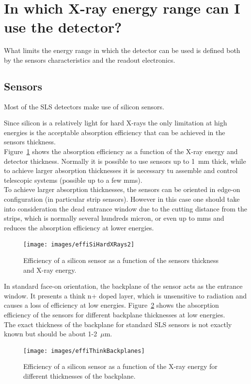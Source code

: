 
\section{In which X-ray energy range can I use the detector?}
What limits the energy range in which the detector can be used is defined both by the sensors characteristics and the readout electronics.

\subsection{Sensors}
Most of the SLS detectors make use of silicon sensors.

Since silicon is a relatively light for hard X-rays the only limitation at high energies is the acceptable absorption efficiency that can be achieved in the sensors thickness.\\
Figure~\ref{fig:effidet} shows the absorption efficiency as a function of the X-ray energy and detector thickness. Normally it is possible to use sensors up to 1~mm thick, while to achieve larger absorption thicknesses it is necessary tu assemble and control telescopic systems (possible up to a few mms).\\
To achieve larger absorption thicknesses, the sensors can be oriented in edge-on configuration (in particular strip sensors). However in this case one should take into consideration the dead entrance window due to the cutting distance from the strips, which is normally several hundreds micron, or even up to mms and reduces the absorption efficiency at lower energies.

\begin{figure}
\caption{Efficiency of a silicon sensor as a function of the sensors thickness and X-ray energy.}\label{fig:effidet}
\texttt{[image: images/effiSiHardXRays2]}
\end{figure} 

In standard face-on orientation, the backplane of the sensor acts as the entrance window. It presents a think n+ doped layer, which is unsensitive to radiation and causes a loss of efficiency at low energies.
Figure~\ref{fig:effiback} shows the absorption efficiency of the sensors for different backplane thicknesses at low energies.\\
The exact thickness of the backplane for standard SLS sensors is not exactly known but should be about 1-2~$\mu$m.

\begin{figure}
\caption{Efficiency of a silicon sensor as a function of the X-ray energy for different thicknesses of the backplane.}\label{fig:effiback}
\texttt{[image: images/effiThinkBackplanes]}
\end{figure} 

